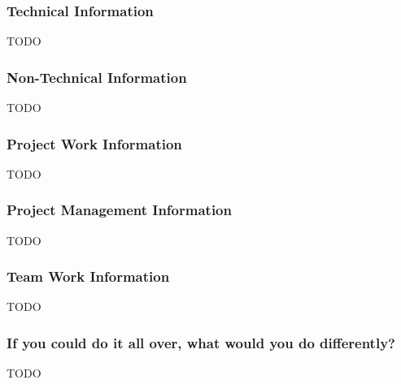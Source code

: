 \subsubsection{Technical Information}
TODO

\subsubsection{Non-Technical Information}
TODO

\subsubsection{Project Work Information}
TODO

\subsubsection{Project Management Information}
TODO

\subsubsection{Team Work Information}
TODO

\subsubsection{If you could do it all over, what would you do differently?}
TODO

